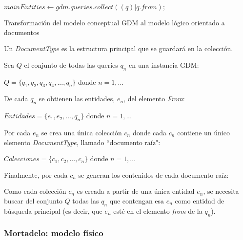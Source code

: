 \begin{algorithm}

    $mainEntities \gets gdm.queries.collect((q)|q.from);$\\
    
    \caption{Transformación del modelo conceptual GDM al modelo lógico orientado a documentos}
\end{algorithm}

Un \textit{DocumentType} es la estructura principal que se guardará en la colección.

Sea $Q$ el conjunto de todas las queries $q_{n}$ en una instancia GDM:


    $Q = \{q_{1}, q_{2}, q_{3}, q_{4},..., q_{n}\}$ donde $n=1,...$

De cada $q_{n}$ se obtienen las entidades, $e_{n}$, del elemento \textit{From}: 


    $ Entidades = \{e_{1},e_{2},...,q_{n}\} $ donde $n=1,...$


Por cada $e_{n}$ se crea una única colección $c_{n}$ donde cada $c_{n}$ contiene un único elemento \textit{DocumentType}, llamado ``documento raíz":


$Colecciones = \{ c_{1},c_{2},...,c_{n}\}$ donde $n=1,...$


Finalmente, por cada $c_{n}$ se generan los contenidos de cada documento raíz:

Como cada colección $c_{n}$ es creada a partir de una única entidad $e_{n}$, se necesita buscar del conjunto $Q$ todas las $q_{n}$ que contengan esa $e_{n}$ como entidad de búsqueda principal (es decir, que $e_{n}$ esté en el elemento \textit{from} de la $q_{n}$).




\subsubsection*{Mortadelo: modelo físico}
